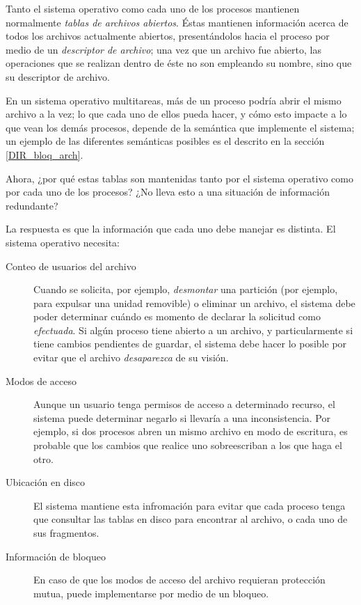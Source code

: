 \documentclass[11pt,fleqn]{book} %
\begin{document}
Tanto el sistema operativo como cada uno de los procesos mantienen
normalmente \emph{tablas de archivos abiertos}. Éstas mantienen información
acerca de todos los archivos actualmente abiertos, presentándolos
hacia el proceso por medio de un \emph{descriptor de archivo}; una vez que
un archivo fue abierto, las operaciones que se realizan dentro de éste
no son empleando su nombre, sino que su descriptor de archivo.

En un sistema operativo multitareas, más de un proceso podría abrir el
mismo archivo a la vez; lo que cada uno de ellos pueda hacer, y cómo
esto impacte a lo que vean los demás procesos, depende de la semántica
que implemente el sistema; un ejemplo de las diferentes semánticas
posibles es el descrito en la sección \ref{DIR_bloq_arch}.

Ahora, ¿por qué estas tablas son mantenidas tanto por el sistema
operativo como por cada uno de los procesos? ¿No lleva esto a una
situación de información redundante?

La respuesta es que la información que cada uno debe manejar es
distinta. El sistema operativo necesita:

\begin{description}
\item[Conteo de usuarios del archivo] Cuando se solicita, por ejemplo,
     \emph{desmontar} una partición (por ejemplo, para expulsar una unidad
     removible) o eliminar un archivo, el sistema debe poder
     determinar cuándo es momento de declarar la solicitud como
     \emph{efectuada}. Si algún proceso tiene abierto a un archivo, y
     particularmente si tiene cambios pendientes de guardar, el
     sistema debe hacer lo posible por evitar que el archivo \emph{desaparezca} de su
     visión.
\item[Modos de acceso] Aunque un usuario tenga permisos de acceso a
     determinado recurso, el sistema puede determinar negarlo si
     llevaría a una inconsistencia. Por ejemplo, si dos procesos abren
     un mismo archivo en modo de escritura, es probable que los
     cambios que realice uno sobreescriban a los que haga el otro.
\item[Ubicación en disco] El sistema mantiene esta infromación 
     para evitar que cada proceso tenga que
     consultar las tablas en disco para encontrar al archivo, o cada
     uno de sus fragmentos.
\item[Información de bloqueo] En caso de que los modos de acceso del
     archivo requieran protección mutua, puede implementarse por
     medio de un bloqueo.
\end{description}
\end{document}
